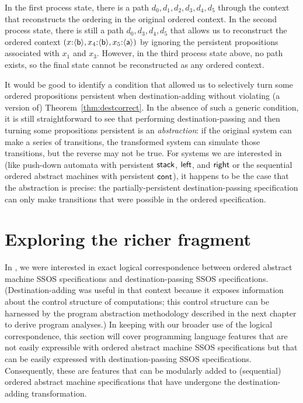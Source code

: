 In the
first process state, there is a path $d_0, d_1, d_2, d_3, d_4, d_5$ through
the context that reconstructs the ordering in the original ordered context.
In the second process state, there is still a path $d_0, d_3, d_4, d_5$ that
allows us to reconstruct the ordered context
$(x{:}\langle {\sf b} \rangle,
  x_4{:}\langle {\sf b} \rangle, x_5{:}\langle {\sf a} \rangle)$ by ignoring the persistent
propositions associated with $x_1$ and $x_3$. 
However, in the third process state above, no path exists, so the final
state cannot be reconstructed as any ordered context. 

It would be good to identify a condition that allowed us to
selectively turn some ordered propositions persistent when
destination-adding without violating (a version of)
Theorem~\ref{thm:destcorrect}. In the absence of such a generic
condition, it is still straightforward to see that performing
destination-passing and then turning some propositions persistent is
an {\it abstraction}: if the original system can make a series of
transitions, the transformed system can simulate those transitions,
but the reverse may not be true. For systems we are interested in
(like push-down automata with persistent ${\sf stack}$, ${\sf left}$,
and ${\sf right}$ or the sequential ordered abstract machines with
persistent ${\sf cont}$), it happens to be the case that the
abstraction is precise: the partially-persistent destination-passing
specification can only make transitions that were possible in the
ordered specification.

\section{Exploring the richer fragment}

In \cite{simmons11logical}, we were interested in exact logical
correspondence between ordered abstract machine SSOS specifications
and destination-passing SSOS specifications. (Destination-adding was
useful in that context because it exposes information about the
control structure of computations; this control structure can be
harnessed by the program abstraction methodology described in the next
chapter to derive program analyses.) In keeping with our broader use
of the logical correspondence, this section will cover programming
language features that are not easily expressible with ordered
abstract machine SSOS specifications but that can be easily expressed
with destination-passing SSOS specifications. Consequently, these are
features that can be modularly added to (sequential) ordered abstract
machine specifications that have undergone the destination-adding
transformation.

